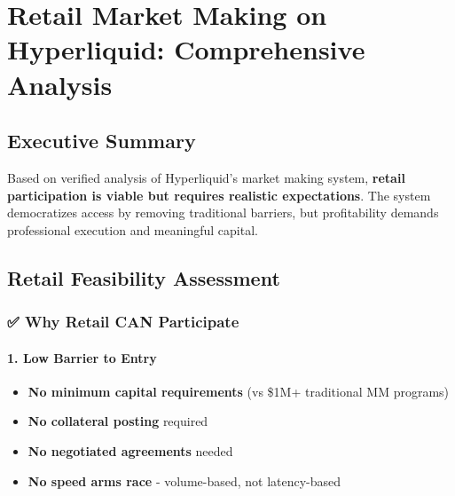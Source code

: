 \hypertarget{retail-market-making-on-hyperliquid-comprehensive-analysis}{%
\section{Retail Market Making on Hyperliquid: Comprehensive
Analysis}\label{retail-market-making-on-hyperliquid-comprehensive-analysis}}

\hypertarget{executive-summary}{%
\subsection{Executive Summary}\label{executive-summary}}

Based on verified analysis of Hyperliquid's market making system,
\textbf{retail participation is viable but requires realistic
expectations}. The system democratizes access by removing traditional
barriers, but profitability demands professional execution and
meaningful capital.

\hypertarget{retail-feasibility-assessment}{%
\subsection{Retail Feasibility
Assessment}\label{retail-feasibility-assessment}}

\hypertarget{why-retail-can-participate}{%
\subsubsection{\texorpdfstring{✅ \textbf{Why Retail CAN
Participate}}{✅ Why Retail CAN Participate}}\label{why-retail-can-participate}}

\hypertarget{low-barrier-to-entry}{%
\paragraph{\texorpdfstring{1. \textbf{Low Barrier to
Entry}}{1. Low Barrier to Entry}}\label{low-barrier-to-entry}}

\begin{itemize}
\tightlist
\item
  \textbf{No minimum capital requirements} (vs \$1M+ traditional MM
  programs)
\item
  \textbf{No collateral posting} required
\item
  \textbf{No negotiated agreements} needed
\item
  \textbf{No speed arms race} - volume-based, not latency-based
\end{itemize}

